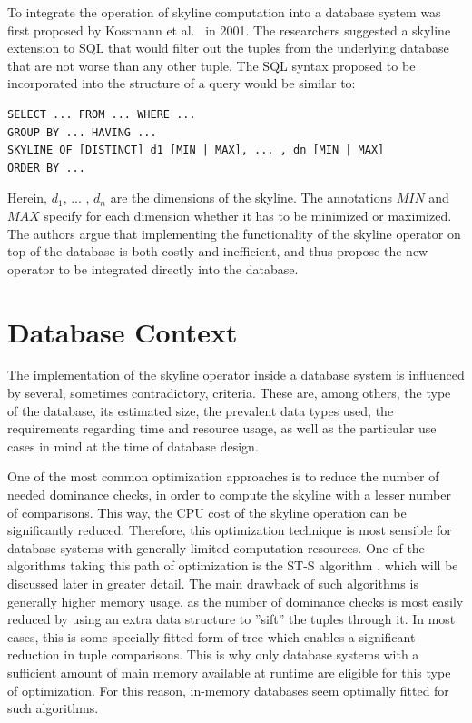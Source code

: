 To integrate the operation of skyline computation into a database system was first proposed by Kossmann et al.~\cite{kossmann} in 2001. The researchers suggested a skyline extension to SQL that would filter out the tuples from the underlying database that are not worse than any other tuple. The SQL syntax proposed to be incorporated into the structure of a query would be similar to: 
\begin{verbatim}
SELECT ... FROM ... WHERE ...
GROUP BY ... HAVING ...
SKYLINE OF [DISTINCT] d1 [MIN | MAX], ... , dn [MIN | MAX]
ORDER BY ...
\end{verbatim}
Herein, $d_{1}$, ... , $d_{n}$ are the dimensions of the skyline. The annotations $MIN$ and $MAX$ specify for each dimension whether it has to be minimized or maximized. 
The authors argue that implementing the functionality of the skyline operator on top of the database is both costly and inefficient, and thus propose the new operator to be integrated directly into the database. 

\section{Database Context} \label{section:database-context}
The implementation of the skyline operator inside a database system is influenced by several, sometimes contradictory, criteria. These are, among others, the type of the database, its estimated size, the prevalent data types used, the requirements regarding time and resource usage, as well as the particular use cases in mind at the time of database design. 

One of the most common optimization approaches is to reduce the number of needed dominance checks, in order to compute the skyline with a lesser number of comparisons. This way, the CPU cost of the skyline operation can be significantly reduced. Therefore, this optimization technique is most sensible for database systems with generally limited computation resources. One of the algorithms taking this path of optimization is the ST-S algorithm \cite{rahman}, which will be discussed later in greater detail. 
The main drawback of such algorithms is generally higher memory usage, as the number of dominance checks is most easily reduced by using an extra data structure to ''sift'' the tuples through it. In most cases, this is some specially fitted form of tree which enables a significant reduction in tuple comparisons. This is why only database systems with a sufficient amount of main memory available at runtime are eligible for this type of optimization. For this reason, in-memory databases seem optimally fitted for such algorithms. 

